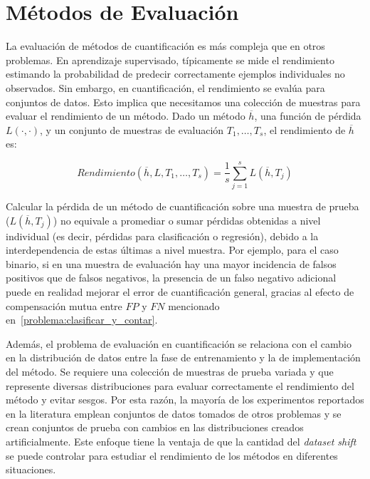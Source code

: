\chapter{Métodos de Evaluación}\label{evaluacion}

La evaluación de métodos de cuantificación es más compleja que en otros
problemas. En aprendizaje supervisado, típicamente se mide el rendimiento
estimando la probabilidad de predecir correctamente ejemplos individuales no
observados. Sin embargo, en cuantificación, el rendimiento se evalúa para
conjuntos de datos. Esto implica que necesitamos una colección de muestras para
evaluar el rendimiento de un método. Dado un método $\overline{h}$, una función
de pérdida $L(\cdot, \cdot)$, y un conjunto de muestras de evaluación ${T_1,
\dots, T_s}$, el rendimiento de $\overline{h}$ es:

\begin{equation}
    Rendimiento(\overline{h}, L, {T_1, \dots , T_s}) = \frac{1}{s}
    \sum \limits_{j=1}^{s}L(\overline{h}, T_j)
    \label{ecuacion_rendimiento}
\end{equation}

Calcular la pérdida de un método de cuantificación sobre una muestra de prueba
($L(\overline{h}, T_j)$) no equivale a promediar o sumar pérdidas obtenidas a
nivel individual (es decir, pérdidas para clasificación o regresión), debido a
la interdependencia de estas últimas a nivel muestra. Por ejemplo, para el caso
binario, si en una muestra de evaluación hay una mayor incidencia de falsos
positivos que de falsos negativos, la presencia de un falso negativo adicional
puede en realidad mejorar el error de cuantificación general, gracias al efecto
de compensación mutua entre $FP$ y $FN$ mencionado
en~\ref{problema:clasificar_y_contar}.

Además, el problema de evaluación en cuantificación se relaciona con el cambio
en la distribución de datos entre la fase de entrenamiento y la de
implementación del método. Se requiere una colección de muestras de prueba
variada y que represente diversas distribuciones para evaluar correctamente el
rendimiento del método y evitar sesgos. Por esta razón, la mayoría de los
experimentos reportados en la literatura emplean conjuntos de datos tomados de
otros problemas y se crean conjuntos de prueba con cambios en las distribuciones
creados artificialmente. Este enfoque tiene la ventaja de que la cantidad del
{\it dataset shift\/} se puede controlar para estudiar el rendimiento de los
métodos en diferentes situaciones.

